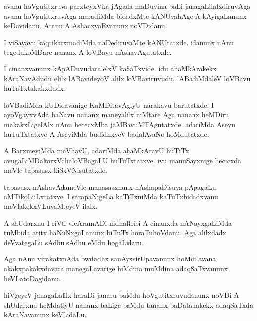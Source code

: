 \documentclass{article}
\begin{document}
\begin{mng}%
avanu hoVgutitxruva parxteyxVka jAgada maDuvina baLi janagaLilalxdiruvAga
avanu hoVgutitxruvAga maradiMda bidadxMte kANUvahAge A
kAyigaLanunx keDavidanu. Atanu A AshacxyaRvanunx noVDidanu.
\end{mng}

\begin{mng}%
I viSayavu kaqtikarxmadiMda naDediruvaMte kANUtatxde. idanunx
nAnu tegedukoMDare nananx A loVBavu nAshavAgutatxde.
\end{mng}

\begin{mng}%
I cinanxvanunx kApADuvudaralelxV kaSaTxvide. idu ahaMkArakekx
kAraNavAdudu elilx lABavideyoV alilx loVBaviruvudu. lABadiMdaleV
loVBavu huTaTxtakakxdudx.
\end{mng}

\begin{mng}%
loVBadiMda kUDidavanige KaMDitavAgiyU narakavu barutatxde.
I ayoVgayxvAda haNavu nananx maneyalilx niMtare Aga nananx heMDiru
makakxLigelAlx nAnu hececxMba jaMBavuMTAgutatxde. adariMda Aseyu huTuTxtatxve
A AseyiMda budidhxyeV badalAvaNe hoMdutatxde.
\end{mng}

\begin{mng}%
A BarxmeyiMda moVhavU, adariMda ahaMkAravU huTiTx
avugaLiMDakorxVdhaloVBagaLU huTuTxtatxve. ivu manuSayxnige hecicxda meVle
tapasusx kiSxVNisutatxde.
\end{mng}

\begin{mng}%
tapasusx nAshavAdameVle manasasxnunx nAshapaDisuva pApagaLu
aMTikoLuLxtatxve. I sarapaNigeLa kaTiTxniMda kaTuTxbidadxvanu meVlakekxVLuvaMteyeV ilalx.
\end{mng}

\begin{mng}%
A shUdarxnu I riVti vicAramADi nidhaRrisi A cinanxda nANayxgaLiMda tuMbida atitx haNuNxgaLanunx biTuTx horaTuhoVdanu. Aga alilxdadx
deVvategaLu sAdhu sAdhu eMdu hogaLidaru.
\end{mng}

\begin{mng}%
Aga nAnu virakatxnAda bwdadhx sanAyxsirUpavanunx hoMdi avana
akakxpakakxdavara manegaLavarige hiMdina muMdina adaqSaTxvanunx heVLatoDagidanu.
\end{mng}

\begin{mng}%
hiVgeyeV janagaLalilx haraDi janaru baMdu hoVgutitxruvudanunx
noVDi A shUdarxnu heMdatiyU nananx baLige baMdu tananx baDatanakekx adaqSaTxda 
kAraNavanunx keVLidaLu.
\end{mng}
\end{document}
